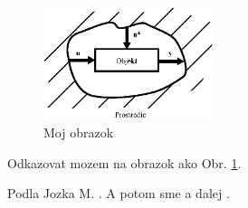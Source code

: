 \documentclass{book}
\begin{document}
\begin{figure}
  \centering
  \includegraphics[width=5cm]{OBRAZOK1_1}
  \caption{Moj obrazok}
  \label{odkaznaobrazok}
\end{figure}

Odkazovat mozem na obrazok ako Obr. \ref{odkaznaobrazok}. 

Podla Jozka M. \cite{Eykhoff84}. A potom sme \cite{Guy99} a dalej \cite{Karny80}.



\end{document}
